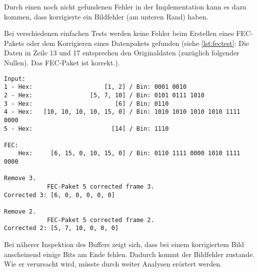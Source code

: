 \documentclass{scrartcl}
\begin{document}
Durch einen noch nicht gefundenen Fehler in der Implementation kann es dazu kommen, dass korrigierte ein Bildfehler (am unteren Rand) haben. 

Bei verschiedenen einfachen Tests werden keine Fehler beim Erstellen eines FEC-Pakets oder dem Korrigieren eines Datenpakets gefunden (siehe \autoref{lst:fectest}: Die Daten in Zeile 13 und 17 entsprechen den Originaldaten (zuzüglich folgender Nullen). Das FEC-Paket ist korrekt.).

\begin{lstlisting}[basicstyle=\footnotesize\ttfamily, caption={Ausgabe des FEC Tests}, captionpos=b,label={lst:fectest}]
Input:
1 - Hex:                    [1, 2] / Bin: 0001 0010           
2 - Hex:                [5, 7, 10] / Bin: 0101 0111 1010      
3 - Hex:                       [6] / Bin: 0110                
4 - Hex:   [10, 10, 10, 10, 15, 0] / Bin: 1010 1010 1010 1010 1111 0000
5 - Hex:                      [14] / Bin: 1110                

FEC:
    Hex:     [6, 15, 0, 10, 15, 0] / Bin: 0110 1111 0000 1010 1111 0000

Remove 3.
			FEC-Paket 5 corrected frame 3.
Corrected 3: [6, 0, 0, 0, 0, 0]

Remove 2.
			FEC-Paket 5 corrected frame 2.
Corrected 2: [5, 7, 10, 0, 0, 0]

\end{lstlisting}

Bei näherer Inspektion des Buffers zeigt sich, dass bei einem korrigiertem Bild anscheinend einige Bits am Ende fehlen. Dadurch kommt der Bildfehler zustande. Wie er verursacht wird, müsste durch weiter Analysen erörtert werden.
\end{document}
